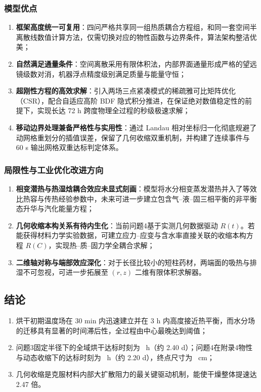 \documentclass[12pt,a4paper,fontset=none]{ctexart}
\begin{document}
\subsubsection{模型优点}
\begin{enumerate}[label=(\arabic*)]
  \item \textbf{框架高度统一可复用}：四问严格共享同一组热质耦合方程组，和同一套空间半离散线数值计算方法，仅需切换对应的物性函数与边界条件，算法架构整洁优美；
  \item \textbf{自然满足通量条件}：空间离散采用有限体积法，内部界面通量形成严格的望远镜级数对消，机器浮点精度级别满足质量与能量守恒；
  \item \textbf{超刚性方程的高效求解}：引入两场三点紧凑模式的稀疏雅可比矩阵优化（CSR），配合自适应高阶 BDF 隐式积分推进，在保证绝对数值稳定性的前提下，实现长达 72 h 跨度物理全过程的秒级极速求解；
  \item \textbf{移动边界处理兼备严格性与实用性}：通过 Landau 相对坐标归一化彻底规避了动网格重划分的插值误差，保留了几何收缩双重机制，并构建了连续事件与 60 s 输出网格双重达标判定体系。
\end{enumerate}

\subsubsection{局限性与工业优化改进方向}
\begin{enumerate}[label=(\arabic*)]
  \item \textbf{相变潜热与热湿焓耦合效应未显式刻画}：模型将水分相变蒸发潜热并入了等效比热容与传热经验参数中，未来可进一步建立包含气--液--固三相平衡的非平衡态升华与汽化能量方程；
  \item \textbf{几何收缩本构关系有待内生化}：当前问题4基于实测几何数据驱动 $R(t)$。若能获得材料力学实验数据，可建立应力--应变与含水率直接关联的收缩本构方程 $R(C)$，实现热--质--固力学全耦合求解；
  \item \textbf{二维轴对称与端部效应深化}：对于长径比较小的短柱药材，两端面的吸热与排湿不可忽视，可进一步拓展至 $(r,z)$ 二维有限体积求解器。
\end{enumerate}

\subsection{结论}
\begin{enumerate}[label=(\arabic*)]
  \item 烘干初期温度场在 30 min 内迅速建立并在 3 h 内高度接近热平衡，而水分场的迁移具有显著的时间滞后性，全过程由中心最晚达到阈值；
  \item 问题3固定半径下的全域烘干达标时刻为 \QThreeDryHours\ h（约 2.40 d）；问题4在附录4物性与动态收缩下的达标时刻为 \QFourDryHours\ h（约 2.20 d），终点尺寸为 \QFourDryRadius\ cm；
  \item 几何收缩是克服材料内部大扩散阻力的最关键驱动机制，能使干燥整体提速达 2.47 倍。
\end{enumerate}
\end{document}
